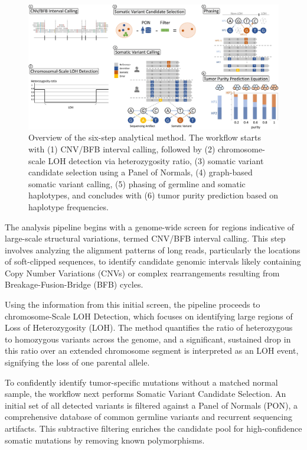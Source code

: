 \documentclass[pdflatex,sn-nature]{sn-jnl}
\def\pandocbounded#1{%
  \begingroup
  \setkeys{Gin}{width=1.0\linewidth,height=1.0\textheight,keepaspectratio}%
  #1%
  \endgroup
}
\begin{document}
\begin{figure}
\centering
\pandocbounded{\includegraphics[keepaspectratio]{page_11_cropped.jpg}}
\caption[Six-Step Analytical Method]{Overview of the six-step analytical method. The workflow starts with (1) CNV/BFB interval calling, followed by (2) chromosome-scale LOH detection via heterozygosity ratio, (3) somatic variant candidate selection using a Panel of Normals, (4) graph-based somatic variant calling, (5) phasing of germline and somatic haplotypes, and concludes with (6) tumor purity prediction based on haplotype frequencies.}\label{fig:met-page-11-cropped-jpg}
\end{figure}

The analysis pipeline begins with a genome-wide screen for regions indicative of large-scale structural variations, termed CNV/BFB interval calling. This step involves analyzing the alignment patterns of long reads, particularly the locations of soft-clipped sequences, to identify candidate genomic intervals likely containing Copy Number Variations (CNVs) or complex rearrangements resulting from Breakage-Fusion-Bridge (BFB) cycles.

Using the information from this initial screen, the pipeline proceeds to chromosome-Scale LOH Detection, which focuses on identifying large regions of Loss of Heterozygosity (LOH). The method quantifies the ratio of heterozygous to homozygous variants across the genome, and a significant, sustained drop in this ratio over an extended chromosome segment is interpreted as an LOH event, signifying the loss of one parental allele.

To confidently identify tumor-specific mutations without a matched normal sample, the workflow next performs Somatic Variant Candidate Selection. An initial set of all detected variants is filtered against a Panel of Normals (PON), a comprehensive database of common germline variants and recurrent sequencing artifacts. This subtractive filtering enriches the candidate pool for high-confidence somatic mutations by removing known polymorphisms.
\end{document}
